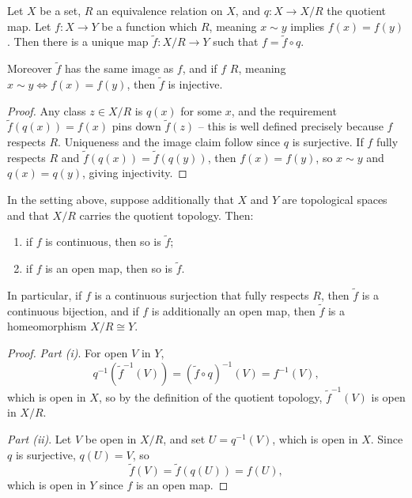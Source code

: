 \documentclass[a4paper]{scrartcl}
\begin{document}
\begin{proposition}
    Let $X$ be a set, $R$ an equivalence relation on $X$, and $q: X \rightarrow X/R$ the quotient map. Let $f: X \rightarrow Y$ be a function which  $R$, meaning $x \sim y$ implies $f(x) = f(y)$. Then there is a unique map $\tilde{f}: X/R \rightarrow Y$ such that $f = \tilde{f} \circ q$.

    Moreover $\tilde{f}$ has the same image as $f$, and if $f$  $R$, meaning $x \sim y \iff f(x) = f(y)$, then $\tilde{f}$ is injective.
\end{proposition}
\begin{proof}
    Any class $z \in X/R$ is $q(x)$ for some $x$, and the requirement $\tilde{f}(q(x)) = f(x)$ pins down $\tilde{f}(z)$ -- this is well defined precisely because $f$ respects $R$. Uniqueness and the image claim follow since $q$ is surjective. If $f$ fully respects $R$ and $\tilde{f}(q(x)) = \tilde{f}(q(y))$, then $f(x) = f(y)$, so $x \sim y$ and $q(x) = q(y)$, giving injectivity.
\end{proof}

\begin{proposition}
    In the setting above, suppose additionally that $X$ and $Y$ are topological spaces and that $X/R$ carries the quotient topology. Then:
    \begin{enumerate}[label=(\roman*)]
        \item if $f$ is continuous, then so is $\tilde{f}$;
        \item if $f$ is an open map, then so is $\tilde{f}$.
    \end{enumerate}
    In particular, if $f$ is a continuous surjection that fully respects $R$, then $\tilde{f}$ is a continuous bijection, and if $f$ is additionally an open map, then $\tilde{f}$ is a homeomorphism $X/R \cong Y$.
\end{proposition}
\begin{proof}
    \emph{Part (i)}. For open $V$ in $Y$,
    $$
    q^{-1}(\tilde{f}^{-1}(V)) = (\tilde{f} \circ q)^{-1}(V) = f^{-1}(V),
    $$
    which is open in $X$, so by the definition of the quotient topology, $\tilde{f}^{-1}(V)$ is open in $X/R$.

    \emph{Part (ii)}. Let $V$ be open in $X/R$, and set $U = q^{-1}(V)$, which is open in $X$. Since $q$ is surjective, $q(U) = V$, so
    $$
    \tilde{f}(V) = \tilde{f}(q(U)) = f(U),
    $$
    which is open in $Y$ since $f$ is an open map.
\end{proof}
\end{document}

